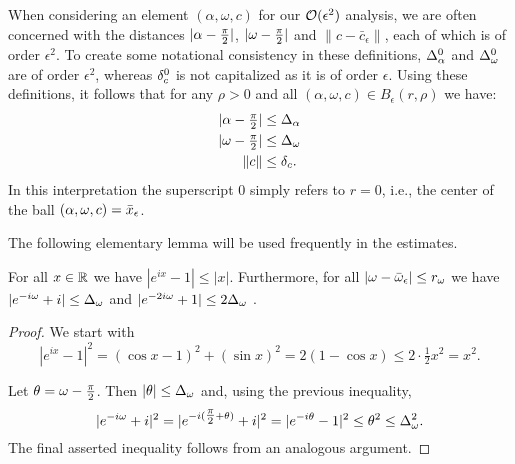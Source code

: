 %
When considering an element $ ( \alpha , \omega, c)$ for our $\mathcal{O}(\epsilon^2)$ analysis, we are often concerned with the 
 distances $|\alpha - \tfrac{\pi}{2}|$, $|\omega - \tfrac{\pi}{2}|$ and $ \| c - \bar{c}_\epsilon\|$, each of which is of order $\epsilon^2$.  
To create some  notational consistency in these definitions, $\Delta_\alpha^0$ and $\Delta_\omega^0$ are of order $\epsilon^2$, whereas $\delta_c^0$ is not capitalized as it is of order $\epsilon$. 
Using these definitions, it follows that for any $\rho>0$ and all  $(\alpha, \omega, c ) \in B_\epsilon(r,\rho)$ we have: 
\begin{alignat*}{1}
| \alpha - \tfrac{\pi}{2} | & \leq  \Delta_\alpha       \\ 
	 | \omega - \tfrac{\pi}{2}| & \leq  \Delta_\omega   \\
	\|c \| &\leq  \delta_c  .
\end{alignat*}
In this interpretation the superscript $0$ simply refers to $r=0$, i.e., the center of the ball $(\alpha,\omega,c) = \bar{x}_\epsilon$.

The following elementary lemma will be used frequently in the estimates. 
\begin{lemma}\label{lem:deltatheta}
For all $x\in \mathbb{R}$ we have $|e^{ix}-1| \leq |x|$.
Furthermore, for all $|\omega - \bar{\omega}_\epsilon  | \leq r_\omega$  
we have 
$ |e^{- i \omega} + i| \leq  \Delta_\omega$ and
$ | e^{-2 i \omega } +1| \leq 2 \Delta_\omega $ .
\end{lemma}
\begin{proof}
We start with
\[
  |e^{ix}-1|^2 = (\cos x -1)^2+(\sin x)^2=2(1-\cos x) \leq 2 \cdot \tfrac{1}{2} x^2 = x^2.
\]

Let $\theta = \omega - \tfrac{\pi}{2}$. Then $|\theta| \leq \Delta_\omega$ and, using the previous inequality,
\[
| e^{- i \omega} + i|^2=
|e^{-i(\tfrac{\pi}{2}+\theta)}+i|^2=|e^{-i\theta}-1|^2 \leq  \theta^2 \leq  \Delta_\omega^2.
\]
The final asserted inequality follows from an analogous argument.
\end{proof}


